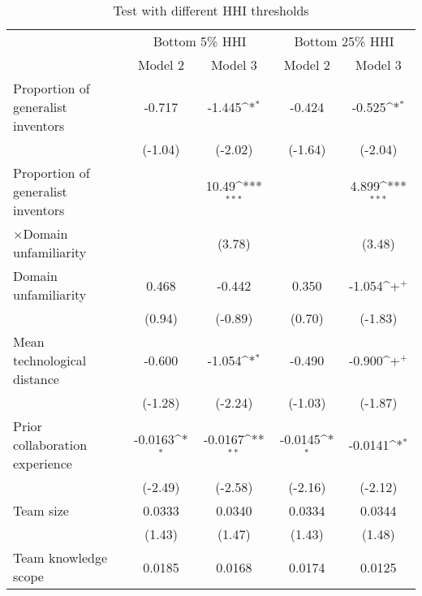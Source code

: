\begin{table}[htbp]\centering
\def\sym#1{\ifmmode^{#1}\else\(^{#1}\)\fi}
\caption{Test with different HHI thresholds\label{genratio}}
\begin{tabular}{l*{4}{c}}
    \toprule
    &\multicolumn{2}{c}{Bottom 5\% HHI}&\multicolumn{2}{c}{Bottom 25\% HHI}\\
    \cmidrule(lr){2-3}\cmidrule(lr){4-5}
    &\multicolumn{1}{c}{Model 2}&\multicolumn{1}{c}{Model 3}&\multicolumn{1}{c}{Model 2}&\multicolumn{1}{c}{Model 3}\\
    \midrule
Proportion of generalist inventors&      -0.717         &      -1.445\sym{*}   &      -0.424         &      -0.525\sym{*}  \\
                                  &      (-1.04)         &       (-2.02)        &     (-1.64)         &     (-2.04)         \\
\addlinespace
Proportion of generalist inventors&                     &       10.49\sym{***}&                     &     4.899\sym{***}   \\
$\times$Domain unfamiliarity      &                     &      (3.78)         &                     &       (3.48)              \\
\addlinespace
Domain unfamiliarity&       0.468         &      -0.442         &       0.350         &      -1.054\sym{+}  \\
                    &      (0.94)         &     (-0.89)         &      (0.70)         &     (-1.83)         \\
\addlinespace
Mean technological distance&      -0.600         &      -1.054\sym{*}  &      -0.490         &      -0.900\sym{+}  \\
                    &     (-1.28)         &     (-2.24)         &     (-1.03)         &     (-1.87)         \\
\addlinespace
Prior collaboration experience&     -0.0163\sym{*}  &     -0.0167\sym{**} &     -0.0145\sym{*}  &     -0.0141\sym{*}  \\
                    &     (-2.49)         &     (-2.58)         &     (-2.16)         &     (-2.12)         \\
\addlinespace
Team size           &      0.0333         &      0.0340         &      0.0334         &      0.0344         \\
                    &      (1.43)         &      (1.47)         &      (1.43)         &      (1.48)         \\
\addlinespace
Team knowledge scope&      0.0185         &      0.0168         &      0.0174         &      0.0125         \\

\end{tabular}
\end{table}
